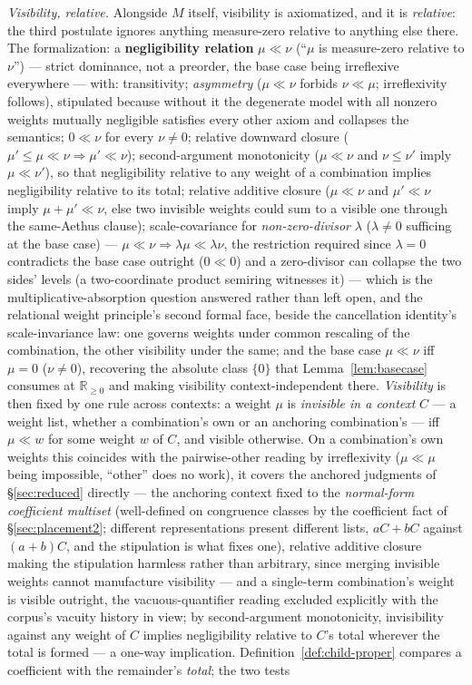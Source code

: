 \textit{Visibility, relative.} Alongside $M$ itself, visibility is axiomatized, and it is \emph{relative}: the third postulate ignores anything measure-zero relative to anything else there. The formalization: a \textbf{negligibility relation} $\mu \ll \nu$ (``$\mu$ is measure-zero relative to $\nu$'') --- strict dominance, not a preorder, the base case being irreflexive everywhere --- with: transitivity; \emph{asymmetry} ($\mu \ll \nu$ forbids $\nu \ll \mu$; irreflexivity follows), stipulated because without it the degenerate model with all nonzero weights mutually negligible satisfies every other axiom and collapses the semantics; $0 \ll \nu$ for every $\nu \neq 0$; relative downward closure ($\mu' \leq \mu \ll \nu \Rightarrow \mu' \ll \nu$); second-argument monotonicity ($\mu \ll \nu$ and $\nu \leq \nu'$ imply $\mu \ll \nu'$), so that negligibility relative to any weight of a combination implies negligibility relative to its total; relative additive closure ($\mu \ll \nu$ and $\mu' \ll \nu$ imply $\mu + \mu' \ll \nu$, else two invisible weights could sum to a visible one through the same-Aethus clause); scale-covariance for \emph{non-zero-divisor} $\lambda$ ($\lambda \neq 0$ sufficing at the base case) --- $\mu \ll \nu \Rightarrow \lambda\mu \ll \lambda\nu$, the restriction required since $\lambda = 0$ contradicts the base case outright ($0 \ll 0$) and a zero-divisor can collapse the two sides' levels (a two-coordinate product semiring witnesses it) --- which is the multiplicative-absorption question answered rather than left open, and the relational weight principle's second formal face, beside the cancellation identity's scale-invariance law: one governs weights under common rescaling of the combination, the other visibility under the same; and the base case $\mu \ll \nu$ iff $\mu = 0$ ($\nu \neq 0$), recovering the absolute class $\{0\}$ that Lemma~\ref{lem:basecase} consumes at $\mathbb{R}_{\geq 0}$ and making visibility context-independent there. \emph{Visibility} is then fixed by one rule across contexts: a weight $\mu$ is \emph{invisible in a context} $C$ --- a weight list, whether a combination's own or an anchoring combination's --- iff $\mu \ll w$ for some weight $w$ of $C$, and visible otherwise. On a combination's own weights this coincides with the pairwise-other reading by irreflexivity ($\mu \ll \mu$ being impossible, ``other'' does no work), it covers the anchored judgments of §\ref{sec:reduced} directly --- the anchoring context fixed to the \emph{normal-form coefficient multiset} (well-defined on congruence classes by the coefficient fact of §\ref{sec:placement2}; different representations present different lists, $aC + bC$ against $(a{+}b)C$, and the stipulation is what fixes one), relative additive closure making the stipulation harmless rather than arbitrary, since merging invisible weights cannot manufacture visibility --- and a single-term combination's weight is visible outright, the vacuous-quantifier reading excluded explicitly with the corpus's vacuity history in view; by second-argument monotonicity, invisibility against any weight of $C$ implies negligibility relative to $C$'s total wherever the total is formed --- a one-way implication. Definition~\ref{def:child-proper} compares a coefficient with the remainder's \emph{total}; the two tests 